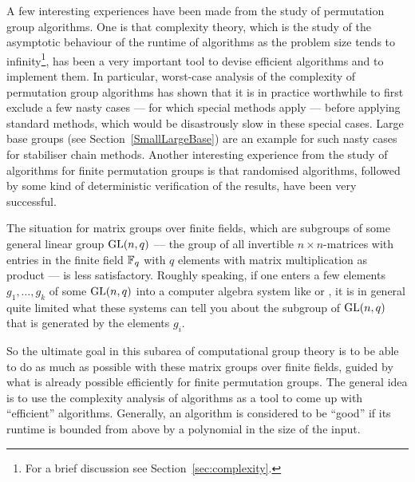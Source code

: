 A few interesting experiences have been made from the study of permutation
group algorithms. One is that 
complexity theory,
%
which is the study of the asymptotic behaviour of the runtime of algorithms 
as the problem size tends to infinity\footnote{For a brief discussion see 
Section~\ref{sec:complexity}.}, has been a very important tool to
devise efficient algorithms and to implement them. In particular,
worst-case analysis of the complexity of permutation group 
algorithms has shown that
%
it is in practice worthwhile to first exclude a few nasty cases ---
for which special methods apply --- before applying standard methods,
which would be disastrously slow in these special cases. Large base
groups (see Section~\ref{SmallLargeBase}) are an example for such
nasty cases for stabiliser chain methods.
Another interesting
experience from the study of algorithms for finite permutation groups 
is that randomised algorithms, followed by some kind of
deterministic verification of the results, have been very successful.
%

The situation for matrix groups over finite fields, which are subgroups 
of some general linear group $\GL(n,q)$ --- the group of all
invertible $n \times n$-matrices with entries in the finite field
$\mathbb{F}_q$ with $q$ elements with matrix multiplication as product ---
is less satisfactory. Roughly speaking, if one enters a few
elements $g_1, \ldots, g_k$ of some $\GL(n,q)$ into a computer algebra 
system like {\GAP} or {\MAGMA}, it is in general quite limited what
these systems can tell you about the subgroup of $\GL(n,q)$ that is
generated by the elements $g_i$.

So the ultimate goal in this subarea of computational group theory
is to be able to do as much as possible with these matrix groups over
finite fields, guided by what is already possible efficiently for
finite permutation groups. The general idea is to use the complexity
analysis of algorithms as a tool to come up with ``efficient''
algorithms. Generally, an algorithm is considered to be ``good'' if
its runtime is bounded from above by a polynomial in the size of the
input.

